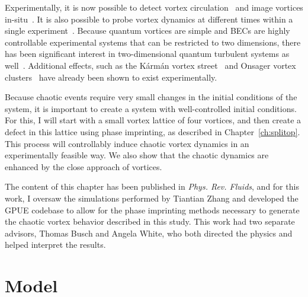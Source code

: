 Experimentally, it is now possible to detect vortex circulation~\cite{seo2017} and image vortices in-situ~\cite{wilson2015}.
It is also possible to probe vortex dynamics at different times within a single experiment~\cite{freilich2010, serafini2017}.
Because quantum vortices are simple and BECs are highly controllable experimental systems that can be restricted to two dimensions, there has been significant interest in two-dimensional quantum turbulent systems as well~\cite{neely2013,shin2004}.
Additional effects, such as the K\'arm\'an vortex street~\cite{kwon2014} and Onsager vortex clusters~\cite{gauthier2018,johnstone2018} have already been shown to exist experimentally.

Because chaotic events require very small changes in the initial conditions of the system, it is important to create a system with well-controlled initial conditions.
For this, I will start with a small vortex lattice of four vortices, and then create a defect in this lattice using phase imprinting, as described in Chapter~\ref{ch:splitop}.
This process will controllably induce chaotic vortex dynamics in an experimentally feasible way.
We also show that the chaotic dynamics are enhanced by the close approach of vortices.

The content of this chapter has been published in \textit{Phys. Rev. Fluids}, and for this work, I oversaw the simulations performed by Tiantian Zhang and developed the GPUE codebase to allow for the phase imprinting methods necessary to generate the chaotic vortex behavior described in this study.
This work had two separate advisors, Thomas Busch and Angela White, who both directed the physics and helped interpret the results.

\section{Model}

